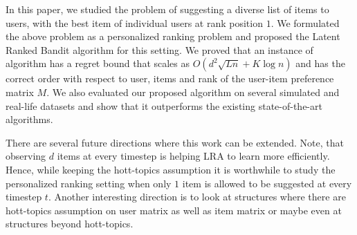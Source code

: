 In this paper, we studied the problem of suggesting a diverse list of items to users, with the best item of individual users at rank position $1$. We formulated the above problem as a personalized ranking problem and proposed the Latent Ranked Bandit algorithm for this setting. We proved that an instance of algorithm has  a regret bound that scales as $O\left(d^2\sqrt{L n} + K \log n\right)$ and has the correct order with respect to user, items and rank of the user-item preference matrix $M$. We also evaluated our proposed algorithm on several simulated and real-life datasets and show that it outperforms the existing state-of-the-art algorithms.

There are several future directions where this work can be extended. Note, that observing $d$ items at every timestep is helping LRA to learn more efficiently. Hence,  while keeping the hott-topics assumption it is worthwhile to study the personalized ranking setting when only $1$ item is allowed to be suggested at every timestep $t$. Another interesting direction is to look at structures where there are hott-topics assumption on user matrix as well as item matrix or maybe even at structures beyond hott-topics.


